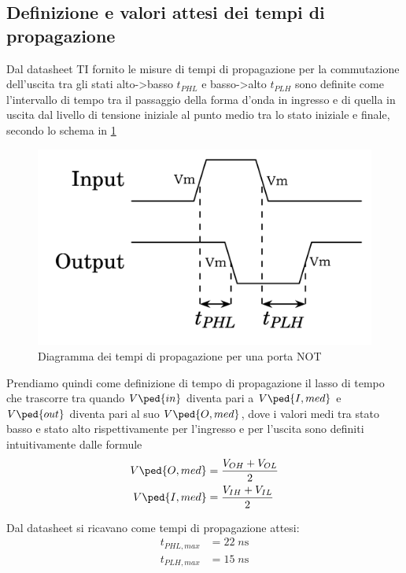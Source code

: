 \documentclass[10pt, a4paper, italian]{article}
\begin{document}
\subsection{Definizione e valori attesi dei tempi di propagazione}
Dal datasheet TI fornito le misure di tempi di propagazione per la commutazione
dell'uscita tra gli stati alto->basso $t_{PHL}$ e basso->alto $t_{PLH}$ sono
definite come l'intervallo di tempo tra il passaggio della forma d'onda in
ingresso e di quella in uscita dal livello di tensione iniziale al punto
medio tra lo stato iniziale e finale, secondo lo schema in \ref{fig: notdelay}
\begin{figure}[htbp]
\centering
	\includegraphics[scale=0.4]{notdelay_mark}
	\caption{Diagramma dei tempi di propagazione per una porta NOT
	\label{fig: notdelay}}
\end{figure}

Prendiamo quindi come definizione di tempo di propagazione il lasso di tempo
che trascorre tra quando $V\ped{in}$ diventa pari a $V\ped{I, med}$ e
$V\ped{out}$ diventa pari al suo $V\ped{O, med}$, dove i valori medi tra stato
basso e stato alto rispettivamente per l'ingresso e per l'uscita sono
definiti intuitivamente dalle formule
\begin{align*}
V\ped{O, med} &= \frac{V_{OH} + V_{OL}}{2} \\
V\ped{I, med} &= \frac{V_{IH} + V_{IL}}{2} \\
\end{align*}

Dal datasheet si ricavano come tempi di propagazione attesi:
\begin{align*}
    t_{PHL,max} &= 22 \; \si{n\s} \\
    t_{PLH,max} &= 15 \; \si{n\s} \\
\end{align*}
\end{document}
